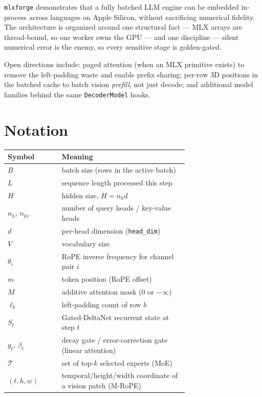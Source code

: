 \documentclass[11pt,a4paper]{report}
\newcommand{\code}[1]{\texttt{#1}}
\begin{document}
\code{mlxforge} demonstrates that a fully batched LLM engine can be embedded
in-process across languages on Apple Silicon, without sacrificing numerical
fidelity. The architecture is organized around one structural fact --- MLX arrays
are thread-bound, so one worker owns the GPU --- and one discipline --- silent
numerical error is the enemy, so every sensitive stage is golden-gated.

Open directions include: paged attention (when an MLX primitive exists) to remove
the left-padding waste and enable prefix sharing; per-row 3D positions in the
batched cache to batch vision \emph{prefill}, not just decode; and additional model
families behind the same \code{DecoderModel} hooks.

\appendix
\chapter{Notation}
\label{app:notation}

\begin{longtable}{@{}l p{0.7\linewidth}@{}}
\toprule
Symbol & Meaning \\
\midrule
\endhead
$B$ & batch size (rows in the active batch) \\
$L$ & sequence length processed this step \\
$H$ & hidden size, $H = n_h d$ \\
$n_h$, $n_{kv}$ & number of query heads / key-value heads \\
$d$ & per-head dimension (\code{head\_dim}) \\
$V$ & vocabulary size \\
$\theta_i$ & RoPE inverse frequency for channel pair $i$ \\
$m$ & token position (RoPE offset) \\
$M$ & additive attention mask ($0$ or $-\infty$) \\
$\ell_b$ & left-padding count of row $b$ \\
$S_t$ & Gated-DeltaNet recurrent state at step $t$ \\
$g_t$, $\beta_t$ & decay gate / error-correction gate (linear attention) \\
$\mathcal{T}$ & set of top-$k$ selected experts (MoE) \\
$(t,h,w)$ & temporal/height/width coordinate of a vision patch (M-RoPE) \\
\bottomrule
\end{longtable}
\end{document}
